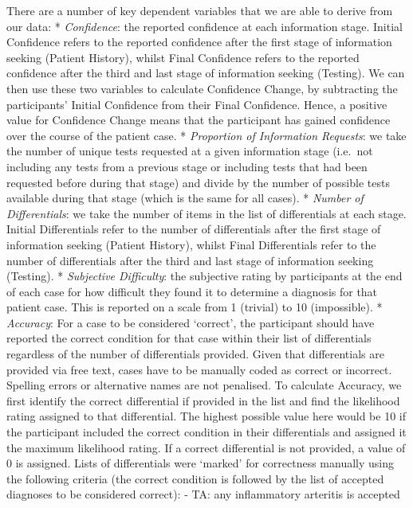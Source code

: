 \documentclass[a4paper, nobind]{templates/ociamthesis}
\begin{document}
There are a number of key dependent variables that we are able to derive from our data:
* \emph{Confidence}: the reported confidence at each information stage. Initial Confidence refers to the reported confidence after the first stage of information seeking (Patient History), whilst Final Confidence refers to the reported confidence after the third and last stage of information seeking (Testing). We can then use these two variables to calculate Confidence Change, by subtracting the participants' Initial Confidence from their Final Confidence. Hence, a positive value for Confidence Change means that the participant has gained confidence over the course of the patient case.
* \emph{Proportion of Information Requests}: we take the number of unique tests requested at a given information stage (i.e.~not including any tests from a previous stage or including tests that had been requested before during that stage) and divide by the number of possible tests available during that stage (which is the same for all cases).
* \emph{Number of Differentials}: we take the number of items in the list of differentials at each stage. Initial Differentials refer to the number of differentials after the first stage of information seeking (Patient History), whilst Final Differentials refer to the number of differentials after the third and last stage of information seeking (Testing).
* \emph{Subjective Difficulty}: the subjective rating by participants at the end of each case for how difficult they found it to determine a diagnosis for that patient case. This is reported on a scale from 1 (trivial) to 10 (impossible).
* \emph{Accuracy}: For a case to be considered `correct', the participant should have reported the correct condition for that case within their list of differentials regardless of the number of differentials provided. Given that differentials are provided via free text, cases have to be manually coded as correct or incorrect. Spelling errors or alternative names are not penalised. To calculate Accuracy, we first identify the correct differential if provided in the list and find the likelihood rating assigned to that differential. The highest possible value here would be 10 if the participant included the correct condition in their differentials and assigned it the maximum likelihood rating. If a correct differential is not provided, a value of 0 is assigned. Lists of differentials were `marked' for correctness manually using the following criteria (the correct condition is followed by the list of accepted diagnoses to be considered correct):
- TA: any inflammatory arteritis is accepted
\end{document}
